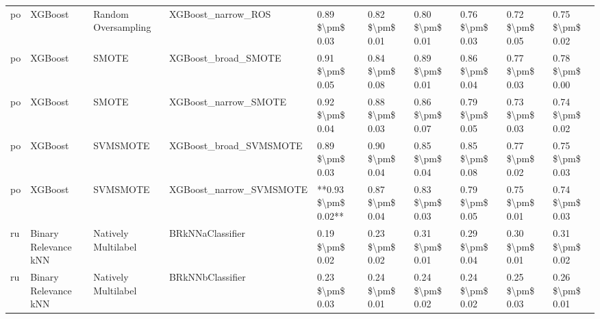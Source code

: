\begin{tabular}{llllllllll}
      po &                         XGBoost &           Random Oversampling &                           XGBoost\_narrow\_ROS &     0.89 \$\textbackslash pm\$ 0.03 &           0.82 \$\textbackslash pm\$ 0.01 &       0.80 \$\textbackslash pm\$ 0.01 &        0.76 \$\textbackslash pm\$ 0.03 &                         0.72 \$\textbackslash pm\$ 0.05 & 0.75 \$\textbackslash pm\$ 0.02 \\
      po &                         XGBoost &                         SMOTE &                          XGBoost\_broad\_SMOTE &     0.91 \$\textbackslash pm\$ 0.05 &           0.84 \$\textbackslash pm\$ 0.08 &       0.89 \$\textbackslash pm\$ 0.01 &        0.86 \$\textbackslash pm\$ 0.04 &                         0.77 \$\textbackslash pm\$ 0.03 & 0.78 \$\textbackslash pm\$ 0.00 \\
      po &                         XGBoost &                         SMOTE &                         XGBoost\_narrow\_SMOTE &     0.92 \$\textbackslash pm\$ 0.04 &           0.88 \$\textbackslash pm\$ 0.03 &       0.86 \$\textbackslash pm\$ 0.07 &        0.79 \$\textbackslash pm\$ 0.05 &                         0.73 \$\textbackslash pm\$ 0.03 & 0.74 \$\textbackslash pm\$ 0.02 \\
      po &                         XGBoost &                      SVMSMOTE &                       XGBoost\_broad\_SVMSMOTE &     0.89 \$\textbackslash pm\$ 0.03 &           0.90 \$\textbackslash pm\$ 0.04 &       0.85 \$\textbackslash pm\$ 0.04 &        0.85 \$\textbackslash pm\$ 0.08 &                         0.77 \$\textbackslash pm\$ 0.02 & 0.75 \$\textbackslash pm\$ 0.03 \\
      po &                         XGBoost &                      SVMSMOTE &                      XGBoost\_narrow\_SVMSMOTE & **0.93 \$\textbackslash pm\$ 0.02** &           0.87 \$\textbackslash pm\$ 0.04 &       0.83 \$\textbackslash pm\$ 0.03 &        0.79 \$\textbackslash pm\$ 0.05 &                         0.75 \$\textbackslash pm\$ 0.01 & 0.74 \$\textbackslash pm\$ 0.03 \\
      ru &            Binary Relevance kNN &           Natively Multilabel &                             BRkNNaClassifier &     0.19 \$\textbackslash pm\$ 0.02 &           0.23 \$\textbackslash pm\$ 0.02 &       0.31 \$\textbackslash pm\$ 0.01 &        0.29 \$\textbackslash pm\$ 0.04 &                         0.30 \$\textbackslash pm\$ 0.01 & 0.31 \$\textbackslash pm\$ 0.02 \\
      ru &            Binary Relevance kNN &           Natively Multilabel &                             BRkNNbClassifier &     0.23 \$\textbackslash pm\$ 0.03 &           0.24 \$\textbackslash pm\$ 0.01 &       0.24 \$\textbackslash pm\$ 0.02 &        0.24 \$\textbackslash pm\$ 0.02 &                         0.25 \$\textbackslash pm\$ 0.03 & 0.26 \$\textbackslash pm\$ 0.01 \\

\end{tabular}
